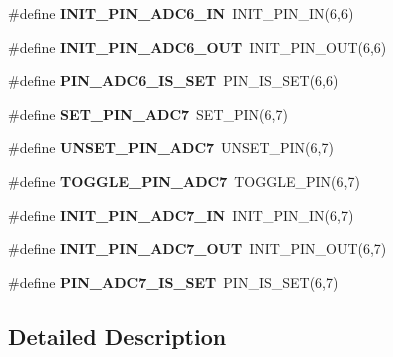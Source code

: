 \begin{DoxyCompactItemize}
\item 
\hypertarget{group__chaos__internal_ga7582fffb8f295bce528713e60d9b5394}{\#define {\bfseries I\-N\-I\-T\-\_\-\-P\-I\-N\-\_\-\-A\-D\-C6\-\_\-\-I\-N}~I\-N\-I\-T\-\_\-\-P\-I\-N\-\_\-\-I\-N(6,6)}\label{group__chaos__internal_ga7582fffb8f295bce528713e60d9b5394}

\item 
\hypertarget{group__chaos__internal_ga045eb405a46d0377dd34662d4b56d5b3}{\#define {\bfseries I\-N\-I\-T\-\_\-\-P\-I\-N\-\_\-\-A\-D\-C6\-\_\-\-O\-U\-T}~I\-N\-I\-T\-\_\-\-P\-I\-N\-\_\-\-O\-U\-T(6,6)}\label{group__chaos__internal_ga045eb405a46d0377dd34662d4b56d5b3}

\item 
\hypertarget{group__chaos__internal_gad5dc1712f4d54b0759d0d1b8f50eb91a}{\#define {\bfseries P\-I\-N\-\_\-\-A\-D\-C6\-\_\-\-I\-S\-\_\-\-S\-E\-T}~P\-I\-N\-\_\-\-I\-S\-\_\-\-S\-E\-T(6,6)}\label{group__chaos__internal_gad5dc1712f4d54b0759d0d1b8f50eb91a}

\item 
\hypertarget{group__chaos__internal_ga289d3de66a286061c6c8b8c52ebd1924}{\#define {\bfseries S\-E\-T\-\_\-\-P\-I\-N\-\_\-\-A\-D\-C7}~S\-E\-T\-\_\-\-P\-I\-N(6,7)}\label{group__chaos__internal_ga289d3de66a286061c6c8b8c52ebd1924}

\item 
\hypertarget{group__chaos__internal_ga2b944db8ca404c3dd61f2c932716e7ef}{\#define {\bfseries U\-N\-S\-E\-T\-\_\-\-P\-I\-N\-\_\-\-A\-D\-C7}~U\-N\-S\-E\-T\-\_\-\-P\-I\-N(6,7)}\label{group__chaos__internal_ga2b944db8ca404c3dd61f2c932716e7ef}

\item 
\hypertarget{group__chaos__internal_gaaaa929c46347e7d25dd0821e56a65e61}{\#define {\bfseries T\-O\-G\-G\-L\-E\-\_\-\-P\-I\-N\-\_\-\-A\-D\-C7}~T\-O\-G\-G\-L\-E\-\_\-\-P\-I\-N(6,7)}\label{group__chaos__internal_gaaaa929c46347e7d25dd0821e56a65e61}

\item 
\hypertarget{group__chaos__internal_ga1d1725175cb15247c08cf55b0e1161b3}{\#define {\bfseries I\-N\-I\-T\-\_\-\-P\-I\-N\-\_\-\-A\-D\-C7\-\_\-\-I\-N}~I\-N\-I\-T\-\_\-\-P\-I\-N\-\_\-\-I\-N(6,7)}\label{group__chaos__internal_ga1d1725175cb15247c08cf55b0e1161b3}

\item 
\hypertarget{group__chaos__internal_ga0e5981ac04e9306f3613570a4e60f3a5}{\#define {\bfseries I\-N\-I\-T\-\_\-\-P\-I\-N\-\_\-\-A\-D\-C7\-\_\-\-O\-U\-T}~I\-N\-I\-T\-\_\-\-P\-I\-N\-\_\-\-O\-U\-T(6,7)}\label{group__chaos__internal_ga0e5981ac04e9306f3613570a4e60f3a5}

\item 
\hypertarget{group__chaos__internal_ga4bb4e9b8ce59c07dc7d3eca26b11f041}{\#define {\bfseries P\-I\-N\-\_\-\-A\-D\-C7\-\_\-\-I\-S\-\_\-\-S\-E\-T}~P\-I\-N\-\_\-\-I\-S\-\_\-\-S\-E\-T(6,7)}\label{group__chaos__internal_ga4bb4e9b8ce59c07dc7d3eca26b11f041}

\end{DoxyCompactItemize}


\subsection{Detailed Description}

